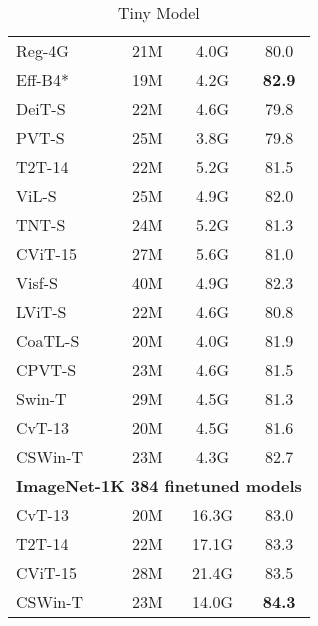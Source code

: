 \documentclass[10pt,twocolumn,letterpaper]{article}
\begin{document}
\begin{table*}[t]
\begin{subtable}[t]{0.33\linewidth}
{{\begin{tabular}[t]{l|cc|c}
\midrule
Reg-4G~\cite{radosavovic2020reg}           & 21M & 4.0G  & 80.0 \\
Eff-B4*~\cite{tan2019efficientnet}         & 19M & 4.2G  & \textbf{82.9} \\
\hline
DeiT-S~\cite{touvron2020deit}              & 22M & 4.6G & 79.8 \\
PVT-S~\cite{wang2021pyramid}               & 25M & 3.8G  & 79.8 \\
T2T-14~\cite{yuan2021tokens}               & 22M & 5.2G  & 81.5 \\
ViL-S~\cite{zhang2021mvit}                 & 25M & 4.9G  & 82.0 \\
TNT-S~\cite{han2021tnt}                    & 24M & 5.2G  & 81.3 \\
CViT-15~\cite{chen2021crossvit}            & 27M & 5.6G  & 81.0 \\
Visf-S~\cite{chen2021visformer}            & 40M & 4.9G  & 82.3 \\
LViT-S~\cite{li2021localvit}               & 22M & 4.6G  & 80.8 \\
CoaTL-S~\cite{xu2021coat}                  & 20M & 4.0G  & 81.9 \\
CPVT-S~\cite{chu2021conditional}           & 23M & 4.6G  & 81.5 \\
Swin-T~\cite{liu2021swin}                  & 29M & 4.5G  & 81.3 \\
CvT-13~\cite{wu2021cvt}                    & 20M & 4.5G  & 81.6 \\
\rowcolor{Graylight} 
CSWin-T                                    & 23M & 4.3G  & 82.7 \\
\midrule
\multicolumn{4}{c}{\textbf{ImageNet-1K 384 finetuned models}} \\
CvT-13 ~\cite{wu2021cvt}                   & 20M & 16.3G & 83.0 \\
T2T-14~\cite{yuan2021tokens}               & 22M & 17.1G & 83.3 \\
CViT-15~\cite{chen2021crossvit}      & 28M & 21.4G & 83.5 \\
\rowcolor{Graylight} 
CSWin-T                                    & 23M & 14.0G & \textbf{84.3} \\
\bottomrule
\end{tabular}}
}
\caption{Tiny Model}
\label{tab:tiny}
\end{subtable}
\hfill
\begin{subtable}[t]{0.33\linewidth}
\centering
{}
\end{subtable}
\end{table*}
\end{document}
